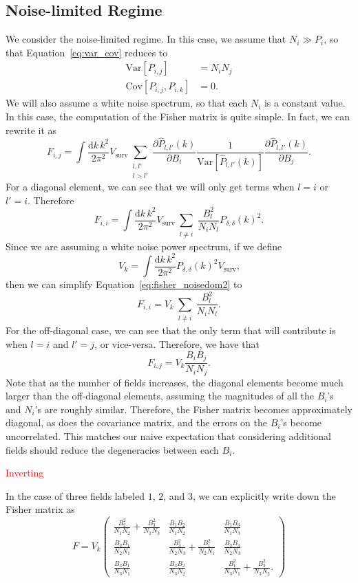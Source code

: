 \documentclass{aastex62}
\newcommand{\Gus}[1]{\textcolor{red}{#1}}
\newcommand{\beq}{\begin{equation}}
\newcommand{\eeq}{\end{equation}}
\newcommand{\denps}{\ensuremath{P_{\delta,\delta}}}
\newcommand{\xps}[2]{\ensuremath{P_{#1,#2}}}
\newcommand{\Var}[1]{\mathrm{Var}[#1]}
\newcommand{\Cov}[2]{\mathrm{Cov}[#1,#2]}
\begin{document}
\subsection{Noise-limited Regime} \label{ssec:noise_limited}
We consider the noise-limited regime. In this case, we assume that $N_i \gg
P_i$, so that Equation~\ref{eq:var_cov} reduces to
\beq \label{eq:var_cov_noise}
\begin{split}
\Var{\xps{i}{j}} &= N_iN_j \\
\Cov{\xps{i}{j}}{\xps{i}{k}} &= 0 \text{.}
\end{split}
\eeq
We will also assume a white noise spectrum, so that each $N_i$ is a constant
value. In this case, the computation of the Fisher matrix is quite simple. In
fact, we can rewrite it as
\beq\label{eq:fisher_noisedom}
F_{i,j} = 
\int \frac{\text{d}k\,k^2}{2\pi^2} V_{\text{surv}} 
\sum_{\substack{l,l'\\l > l'}}
\frac{\partial \hat{P}_{l,l'}(k)}{\partial B_i}
\frac{1}{\Var{\hat{P}_{l,l'}(k)}}
\frac{\partial \hat{P}_{l,l'}(k)}{\partial B_j}\text{.}
\eeq
For a diagonal element, we can see that we will only get terms when $l=i$ or $l'=i$. Therefore
\beq\label{eq:fisher_noisedom2}
F_{i,i} = 
\int \frac{\text{d}k\,k^2}{2\pi^2} V_{\text{surv}} 
\sum_{\substack{l\neq i}}
\frac{B_l^2}{N_iN_l}\denps(k)^2\text{.}
\eeq
Since we are assuming a white noise power spectrum, if we define
\begin{equation*}
V_k = \int \frac{\text{d}k\,k^2}{2\pi^2} \denps(k)^2 V_{\text{surv}}\text{,}
\end{equation*}
then we can simplify Equation~\ref{eq:fisher_noisedom2} to
\beq\label{eq:fisher_noisedom_diag}
F_{i,i} = 
V_k
\sum_{\substack{l\neq i}}
\frac{B_l^2}{N_iN_l}\text{.}
\eeq
For the off-diagonal case, we can see that the only term that will contribute
is when $l=i$ and $l'=j$, or vice-versa. Therefore, we have that
\beq\label{eq:fisher_noisedom_offdiag}
F_{i,j} = V_k
\frac{B_iB_j}{N_iN_j}\text{.}
\eeq
Note that as the number of fields increases, the diagonal elements become much
larger than the off-diagonal elements, assuming the magnitudes of all the
$B_i$'s and $N_i$'s are roughly similar. Therefore, the Fisher matrix becomes
approximately diagonal, as does the covariance matrix, and the errors on the
$B_i$'s become uncorrelated. This matches our naive expectation that
considering additional fields should reduce the degeneracies between each
$B_i$.

\Gus{Inverting}

In the case of three fields labeled $1$, $2$, and $3$, we can explicitly write
down the Fisher matrix as
\beq
F = V_k
\begin{pmatrix}
\frac{B_2^2}{N_1N_2}+\frac{B_3^2}{N_1N_3} & \frac{B_1B_2}{N_1N_2} & \frac{B_1B_3}{N_1N_3} \\
\frac{B_2B_1}{N_2N_1} & \frac{B_3^2}{N_2N_3}+\frac{B_1^2}{N_2N_1} & \frac{B_2B_3}{N_2N_3} \\
\frac{B_3B_1}{N_3N_1} & \frac{B_3B_2}{N_3N_2} & \frac{B_1^2}{N_3N_1}+\frac{B_2^2}{N_3N_2}\text{.}
\end{pmatrix}
\eeq
\end{document}
